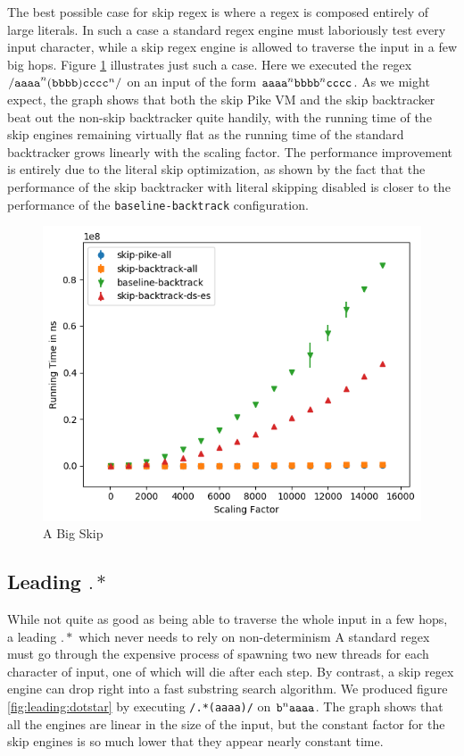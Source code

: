The best possible case for skip regex is where a regex is composed
entirely of large literals. In such a case a standard regex engine
must laboriously test every input character, while a skip regex
engine is allowed to traverse the input in a few big hops. Figure
\ref{fig:a:big:skip} illustrates just such a case. Here we executed the
regex ${\tt /aaaa}^n{\tt (bbbb)}{\tt cccc}^n{\tt /}$ on
an input of the form ${\tt aaaa}^n{\tt bbbb}^n{\tt cccc}$.
As we might expect,
the graph shows that both the skip Pike VM and the skip backtracker
beat out the non-skip backtracker quite handily, with the running time
of the skip engines remaining virtually flat as the running
time of the standard backtracker grows linearly with the scaling factor.
The performance improvement is entirely due to the literal skip
optimization, as shown by the fact that the performance of the skip
backtracker with literal skipping disabled is closer to the performance
of the \verb'baseline-backtrack' configuration.

\begin{figure}
\caption{A Big Skip}
\label{fig:a:big:skip}

\includegraphics{resources/a-big-skip.png}
\end{figure}

\subsection{Leading $.*$}

While not quite as good as being able to traverse the whole input
in a few hops, a leading $.*$ which never needs to rely on non-determinism
A standard regex must go through the expensive process of spawning
two new threads for each character of input, one of which will die after
each step. By contrast, a skip regex engine can drop right into a fast substring
search algorithm. We produced figure \ref{fig:leading:dotstar} by executing
\verb'/.*(aaaa)/' on ${\tt b}^n{\tt aaaa}$.
The graph shows that all the engines are linear
in the size of the input, but the constant factor for the skip engines
is so much lower that they appear nearly constant time.

